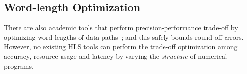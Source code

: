 \subsection{Word-length Optimization}
\label{bg:sub:wordlength}

There are also academic tools that perform precision-performance trade-off by
optimizing word-lengths of data-paths~\cite{constantinides}; and this safely
bounds round-off errors.  However, no existing HLS tools can perform the
trade-off optimization among accuracy, resource usage and latency by varying
the \emph{structure} of numerical programs.
